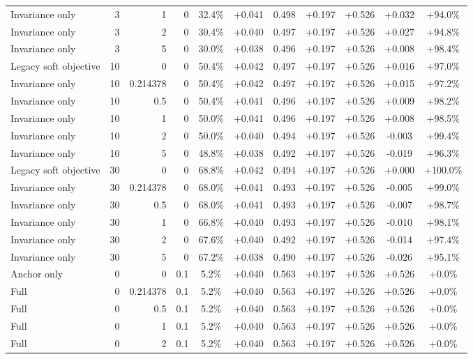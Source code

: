 \begin{table}[htbp]
\begin{tabular}{lrrrccccccc}
Invariance only & 3 & 1 & 0 & 32.4\% & +0.041 & 0.498 & +0.197 & +0.526 & +0.032 & +94.0\% \\
Invariance only & 3 & 2 & 0 & 30.4\% & +0.040 & 0.497 & +0.197 & +0.526 & +0.027 & +94.8\% \\
Invariance only & 3 & 5 & 0 & 30.0\% & +0.038 & 0.496 & +0.197 & +0.526 & +0.008 & +98.4\% \\
Legacy soft objective & 10 & 0 & 0 & 50.4\% & +0.042 & 0.497 & +0.197 & +0.526 & +0.016 & +97.0\% \\
Invariance only & 10 & 0.214378 & 0 & 50.4\% & +0.042 & 0.497 & +0.197 & +0.526 & +0.015 & +97.2\% \\
Invariance only & 10 & 0.5 & 0 & 50.4\% & +0.041 & 0.496 & +0.197 & +0.526 & +0.009 & +98.2\% \\
Invariance only & 10 & 1 & 0 & 50.0\% & +0.041 & 0.496 & +0.197 & +0.526 & +0.008 & +98.5\% \\
Invariance only & 10 & 2 & 0 & 50.0\% & +0.040 & 0.494 & +0.197 & +0.526 & -0.003 & +99.4\% \\
Invariance only & 10 & 5 & 0 & 48.8\% & +0.038 & 0.492 & +0.197 & +0.526 & -0.019 & +96.3\% \\
Legacy soft objective & 30 & 0 & 0 & 68.8\% & +0.042 & 0.494 & +0.197 & +0.526 & +0.000 & +100.0\% \\
Invariance only & 30 & 0.214378 & 0 & 68.0\% & +0.041 & 0.493 & +0.197 & +0.526 & -0.005 & +99.0\% \\
Invariance only & 30 & 0.5 & 0 & 68.0\% & +0.041 & 0.493 & +0.197 & +0.526 & -0.007 & +98.7\% \\
Invariance only & 30 & 1 & 0 & 66.8\% & +0.040 & 0.493 & +0.197 & +0.526 & -0.010 & +98.1\% \\
Invariance only & 30 & 2 & 0 & 67.6\% & +0.040 & 0.492 & +0.197 & +0.526 & -0.014 & +97.4\% \\
Invariance only & 30 & 5 & 0 & 67.2\% & +0.038 & 0.490 & +0.197 & +0.526 & -0.026 & +95.1\% \\
Anchor only & 0 & 0 & 0.1 & 5.2\% & +0.040 & 0.563 & +0.197 & +0.526 & +0.526 & +0.0\% \\
Full & 0 & 0.214378 & 0.1 & 5.2\% & +0.040 & 0.563 & +0.197 & +0.526 & +0.526 & +0.0\% \\
Full & 0 & 0.5 & 0.1 & 5.2\% & +0.040 & 0.563 & +0.197 & +0.526 & +0.526 & +0.0\% \\
Full & 0 & 1 & 0.1 & 5.2\% & +0.040 & 0.563 & +0.197 & +0.526 & +0.526 & +0.0\% \\
Full & 0 & 2 & 0.1 & 5.2\% & +0.040 & 0.563 & +0.197 & +0.526 & +0.526 & +0.0\% \\

\end{tabular}
\end{table}
